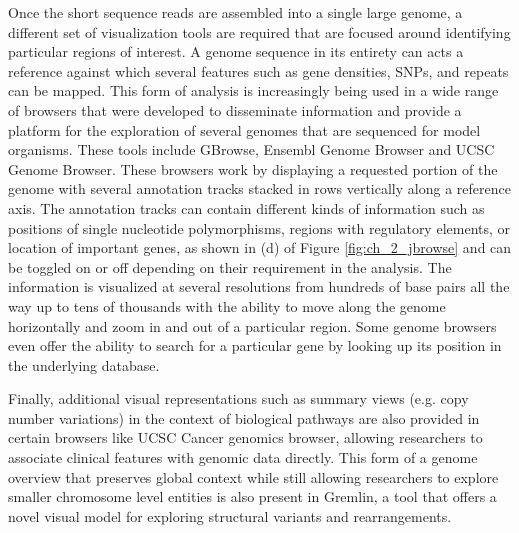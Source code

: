 Once the short sequence reads are assembled into a single large genome, a different set of visualization tools are required that are focused around identifying particular regions of interest. A genome sequence in its entirety can acts a reference against which several features such as gene densities, SNPs, and repeats can be mapped. This form of analysis is increasingly being used in a wide range of browsers that were developed to disseminate information and provide a platform for the exploration of several genomes that are sequenced for model organisms. These tools include GBrowse\cite{stein2002generic}, Ensembl Genome Browser\cite{stalker2004ensembl} and UCSC Genome Browser\cite{ucscgenome}. These browsers work by displaying a requested portion of the genome with several annotation tracks stacked in rows vertically along a reference axis. The annotation tracks can contain different kinds of information such as positions of single nucleotide polymorphisms, regions with regulatory elements, or location of important genes, as shown in (d) of Figure \ref{fig:ch_2_jbrowse} and can be toggled on or off depending on their requirement in the analysis. The information is visualized at several resolutions from hundreds of base pairs all the way up to tens of thousands with the ability to move along the genome horizontally and zoom in and out of a particular region. Some genome browsers even offer the ability to search for a particular gene by looking up its position in the underlying database\cite{nielsen2010visualizing}. 

Finally, additional visual representations such as summary views (e.g. copy number variations) in the context of biological pathways are also provided in certain browsers like UCSC Cancer genomics browser\cite{ucscgenome}, allowing researchers to associate clinical features with genomic data directly. This form of a genome overview that preserves global context while still allowing researchers to explore smaller chromosome level entities is also present in Gremlin, a tool that offers a novel visual model for exploring structural variants and rearrangements\cite{o2010gremlin}.  

